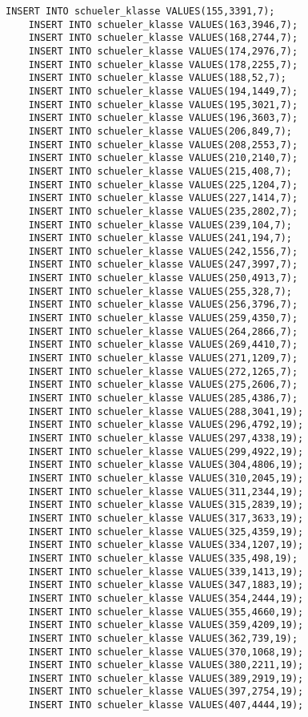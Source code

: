\begin{lstlisting}[breaklines=True, numbers=none, basicstyle=\tiny, keepspaces=false]
	INSERT INTO schueler_klasse VALUES(155,3391,7);
	INSERT INTO schueler_klasse VALUES(163,3946,7);
	INSERT INTO schueler_klasse VALUES(168,2744,7);
	INSERT INTO schueler_klasse VALUES(174,2976,7);
	INSERT INTO schueler_klasse VALUES(178,2255,7);
	INSERT INTO schueler_klasse VALUES(188,52,7);
	INSERT INTO schueler_klasse VALUES(194,1449,7);
	INSERT INTO schueler_klasse VALUES(195,3021,7);
	INSERT INTO schueler_klasse VALUES(196,3603,7);
	INSERT INTO schueler_klasse VALUES(206,849,7);
	INSERT INTO schueler_klasse VALUES(208,2553,7);
	INSERT INTO schueler_klasse VALUES(210,2140,7);
	INSERT INTO schueler_klasse VALUES(215,408,7);
	INSERT INTO schueler_klasse VALUES(225,1204,7);
	INSERT INTO schueler_klasse VALUES(227,1414,7);
	INSERT INTO schueler_klasse VALUES(235,2802,7);
	INSERT INTO schueler_klasse VALUES(239,104,7);
	INSERT INTO schueler_klasse VALUES(241,194,7);
	INSERT INTO schueler_klasse VALUES(242,1556,7);
	INSERT INTO schueler_klasse VALUES(247,3997,7);
	INSERT INTO schueler_klasse VALUES(250,4913,7);
	INSERT INTO schueler_klasse VALUES(255,328,7);
	INSERT INTO schueler_klasse VALUES(256,3796,7);
	INSERT INTO schueler_klasse VALUES(259,4350,7);
	INSERT INTO schueler_klasse VALUES(264,2866,7);
	INSERT INTO schueler_klasse VALUES(269,4410,7);
	INSERT INTO schueler_klasse VALUES(271,1209,7);
	INSERT INTO schueler_klasse VALUES(272,1265,7);
	INSERT INTO schueler_klasse VALUES(275,2606,7);
	INSERT INTO schueler_klasse VALUES(285,4386,7);
	INSERT INTO schueler_klasse VALUES(288,3041,19);
	INSERT INTO schueler_klasse VALUES(296,4792,19);
	INSERT INTO schueler_klasse VALUES(297,4338,19);
	INSERT INTO schueler_klasse VALUES(299,4922,19);
	INSERT INTO schueler_klasse VALUES(304,4806,19);
	INSERT INTO schueler_klasse VALUES(310,2045,19);
	INSERT INTO schueler_klasse VALUES(311,2344,19);
	INSERT INTO schueler_klasse VALUES(315,2839,19);
	INSERT INTO schueler_klasse VALUES(317,3633,19);
	INSERT INTO schueler_klasse VALUES(325,4359,19);
	INSERT INTO schueler_klasse VALUES(334,1207,19);
	INSERT INTO schueler_klasse VALUES(335,498,19);
	INSERT INTO schueler_klasse VALUES(339,1413,19);
	INSERT INTO schueler_klasse VALUES(347,1883,19);
	INSERT INTO schueler_klasse VALUES(354,2444,19);
	INSERT INTO schueler_klasse VALUES(355,4660,19);
	INSERT INTO schueler_klasse VALUES(359,4209,19);
	INSERT INTO schueler_klasse VALUES(362,739,19);
	INSERT INTO schueler_klasse VALUES(370,1068,19);
	INSERT INTO schueler_klasse VALUES(380,2211,19);
	INSERT INTO schueler_klasse VALUES(389,2919,19);
	INSERT INTO schueler_klasse VALUES(397,2754,19);
	INSERT INTO schueler_klasse VALUES(407,4444,19);

\end{lstlisting}
